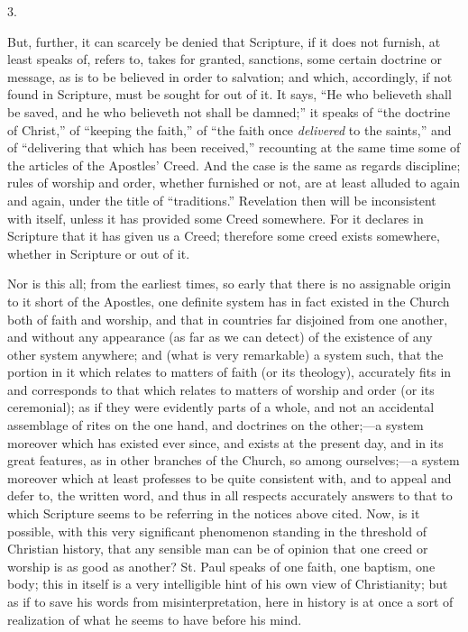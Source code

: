 3.

But, further, it can scarcely be denied that Scripture, if it does
not furnish, at least speaks of, refers to, takes for granted,
sanctions, some certain doctrine or message, as is to be believed in
order to salvation; and which, accordingly, if not found in Scripture,
must be sought for out of it. It says, ``He who believeth shall be
saved, and he who believeth not shall be damned;'' it speaks of
``the doctrine of Christ,'' of ``keeping the faith,''
of ``the faith once \emph{delivered} to the saints,'' and of
``delivering that which has been received,'' recounting at the
same time some of the articles of the Apostles' Creed. And the case is
the same as regards discipline; rules of worship and order, whether
furnished or not, are at least alluded to again and again, under the
title of ``traditions.'' Revelation then will be inconsistent
with itself, unless it has provided some Creed somewhere. For it
declares in Scripture that it has given us a Creed; therefore some
creed exists somewhere, whether in Scripture or out of it.

Nor is this all; from the earliest times, so early that there is no
assignable origin to it short of the Apostles, one definite system has
in fact existed in the Church both of faith and worship, and that in
countries far disjoined from one another, and without any appearance
(as far as we can detect) of the existence of any other system
anywhere; and (what is very remarkable) a system such, that the
portion in it which relates to matters of faith (or its theology),
accurately fits in and corresponds to that which relates to matters of
worship and order (or its ceremonial); as if they were evidently parts
of a whole, and not an accidental assemblage of rites on the one
hand, and doctrines on the other;—a system moreover which has
existed ever since, and exists at the present day, and in its great
features, as in other branches of the Church, so among ourselves;—a
system moreover which at least professes to be quite consistent with,
and to appeal and defer to, the written word, and thus in all respects
accurately answers to that to which Scripture seems to be referring in
the notices above cited. Now, is it possible, with this very
significant phenomenon standing in the threshold of Christian history,
that any sensible man can be of opinion that one creed or worship is
as good as another? St. Paul speaks of one faith, one baptism, one
body; this in itself is a very intelligible hint of his own view of
Christianity; but as if to save his words from misinterpretation, here
in history is at once a sort of realization of what he seems to have
before his mind.

